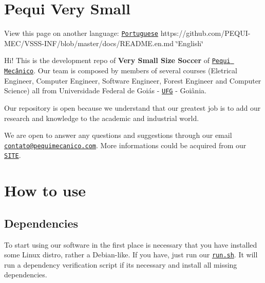 

\section*{Pequi Very Small}

\href{https://travis-ci.org/PEQUI-MEC/VSSS-INF}{\tt } \href{https://www.codacy.com/app/eduardoquijano2/VSSS-INF?utm_source=github.com&amp;utm_medium=referral&amp;utm_content=PEQUI-MEC/VSSS-INF&amp;utm_campaign=Badge_Grade}{\tt }   \href{https://github.com/PEQUI-MEC/VSSS-INF/blob/master/docs/LICENSE}{\tt }

View this page on another language\+: \href{https://github.com/PEQUI-MEC/VSSS-INF}{\tt Portuguese} https\+://github.com/\+P\+E\+Q\+U\+I-\/\+M\+E\+C/\+V\+S\+S\+S-\/\+I\+N\+F/blob/master/docs/\+R\+E\+A\+D\+M\+E.\+en.\+md \char`\"{}\+English\char`\"{}

Hi! This is the development repo of {\bfseries Very Small Size Soccer} of \href{https://www.facebook.com/NucleoPMec/}{\tt Pequi Mecânico}. Our team is composed by members of several courses (Eletrical Engineer, Computer Engineer, Software Engineer, Forest Engineer and Computer Science) all from Universidade Federal de Goiás -\/ \href{https://www.ufg.br/}{\tt U\+FG} -\/ Goiânia.

Our repository is open because we understand that our greatest job is to add our research and knowledge to the academic and industrial world.

We are open to answer any questions and suggestions through our email \href{mailto:contato@pequimecanico.com}{\tt contato@pequimecanico.\+com}. More informations could be acquired from our \href{https://pequimecanico.com/}{\tt S\+I\+TE}.

\section*{How to use}

\subsection*{Dependencies}

To start using our software in the first place is necessary that you have installed some Linux distro, rather a Debian-\/like. If you have, just run our \href{https://github.com/PEQUI-MEC/VSSS-INF/blob/master/run.sh}{\tt run.\+sh}. It will run a dependency verification script if its necessary and install all missing dependencies.

